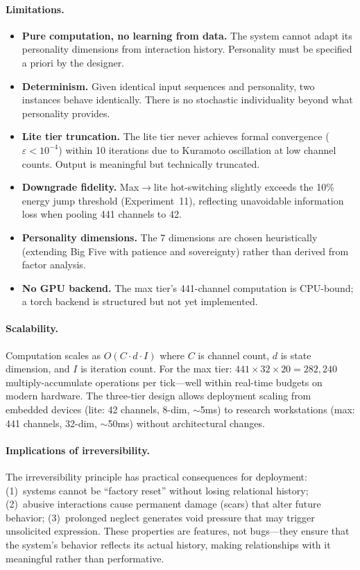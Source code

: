 \documentclass[11pt]{article}
\begin{document}
\paragraph{Limitations.}
\begin{itemize}[leftmargin=*]
\item \textbf{Pure computation, no learning from data.} The system cannot adapt its personality dimensions from interaction history. Personality must be specified a priori by the designer.
\item \textbf{Determinism.} Given identical input sequences and personality, two instances behave identically. There is no stochastic individuality beyond what personality provides.
\item \textbf{Lite tier truncation.} The lite tier never achieves formal convergence ($\varepsilon < 10^{-4}$) within 10 iterations due to Kuramoto oscillation at low channel counts. Output is meaningful but technically truncated.
\item \textbf{Downgrade fidelity.} Max$\to$lite hot-switching slightly exceeds the 10\% energy jump threshold (Experiment~11), reflecting unavoidable information loss when pooling 441 channels to 42.
\item \textbf{Personality dimensions.} The 7 dimensions are chosen heuristically (extending Big Five with patience and sovereignty) rather than derived from factor analysis.
\item \textbf{No GPU backend.} The max tier's 441-channel computation is CPU-bound; a torch backend is structured but not yet implemented.
\end{itemize}

\paragraph{Scalability.} Computation scales as $O(C \cdot d \cdot I)$ where $C$ is channel count, $d$ is state dimension, and $I$ is iteration count. For the max tier: $441 \times 32 \times 20 = 282{,}240$ multiply-accumulate operations per tick---well within real-time budgets on modern hardware. The three-tier design allows deployment scaling from embedded devices (lite: 42 channels, 8-dim, $\sim$5ms) to research workstations (max: 441 channels, 32-dim, $\sim$50ms) without architectural changes.

\paragraph{Implications of irreversibility.} The irreversibility principle has practical consequences for deployment: (1)~systems cannot be ``factory reset'' without losing relational history; (2)~abusive interactions cause permanent damage (scars) that alter future behavior; (3)~prolonged neglect generates void pressure that may trigger unsolicited expression. These properties are features, not bugs---they ensure that the system's behavior reflects its actual history, making relationships with it meaningful rather than performative.
\end{document}
